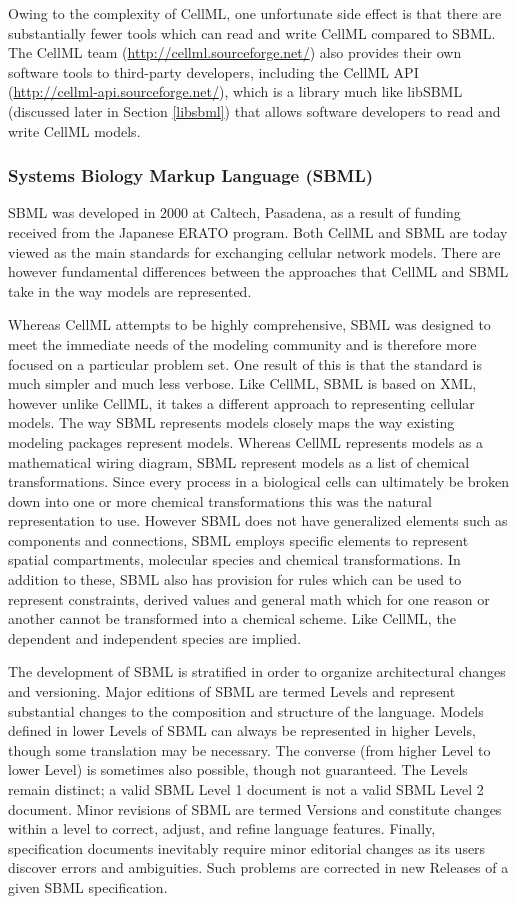 Owing to the complexity of CellML, one unfortunate side effect is that
there are substantially fewer tools which can read and write CellML
compared to SBML. The CellML team (\url{http://cellml.sourceforge.net/})
also provides their own software tools to third-party developers,
including the CellML API (\url{http://cellml-api.sourceforge.net/}),
which is a library much like libSBML (discussed later in Section
\ref{libsbml}) that allows software developers to read and write CellML
models.

\subsubsection{Systems Biology Markup Language (SBML)}

SBML was developed in 2000 at Caltech, Pasadena, as a result of funding
received from the Japanese ERATO program. Both CellML and SBML are today
viewed as the main standards for exchanging cellular network models.
There are however fundamental differences between the approaches that
CellML and SBML take in the way models are represented.

Whereas CellML attempts to be highly comprehensive, SBML was designed to
meet the immediate needs of the modeling community and is therefore more
focused on a particular problem set. One result of this is that the
standard is much simpler and much less verbose. Like CellML, SBML is
based on XML, however unlike CellML, it takes a different approach to
representing cellular models. The way SBML represents models closely
maps the way existing modeling packages represent models. Whereas CellML
represents models as a mathematical wiring diagram, SBML represent
models as a list of chemical transformations. Since every process in a
biological cells can ultimately be broken down into one or more chemical
transformations this was the natural representation to use. However SBML
does not have generalized elements such as components and connections,
SBML employs specific elements to represent spatial compartments,
molecular species and chemical transformations. In addition to these,
SBML also has provision for rules which can be used to represent
constraints, derived values and general math which for one reason or
another cannot be transformed into a chemical scheme. Like CellML, the
dependent and independent species are implied.

The development of SBML is stratified in order to organize architectural
changes and versioning. Major editions of SBML are termed Levels and
represent substantial changes to the composition and structure of the
language. Models defined in lower Levels of SBML can always be
represented in higher Levels, though some translation may be necessary.
The converse (from higher Level to lower Level) is sometimes also
possible, though not guaranteed. The Levels remain distinct; a valid
SBML Level 1 document is not a valid SBML Level 2 document. Minor
revisions of SBML are termed Versions and constitute changes within a
level to correct, adjust, and refine language features. Finally,
specification documents inevitably require minor editorial changes as
its users discover errors and ambiguities. Such problems are corrected
in new Releases of a given SBML specification.

